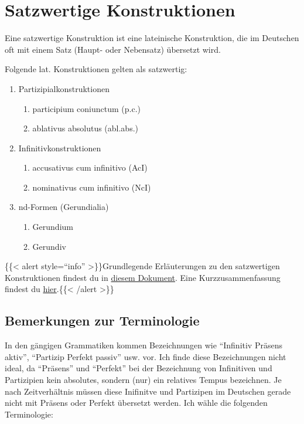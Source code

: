 \documentclass{scrartcl}
\begin{document}
\section{Satzwertige Konstruktionen}
\label{sec:org5e2f0dd}
Eine satzwertige Konstruktion ist eine lateinische Konstruktion, die
im Deutschen oft mit einem Satz (Haupt- oder Nebensatz) übersetzt
wird.

Folgende lat. Konstruktionen gelten als satzwertig:

\begin{enumerate}
\item Partizipialkonstruktionen
\begin{enumerate}
\item participium coniunctum (p.c.)
\item ablativus absolutus (abl.abs.)
\end{enumerate}
\item Infinitivkonstruktionen
\begin{enumerate}
\item accusativus cum infinitivo (AcI)
\item nominativus cum infinitivo (NcI)
\end{enumerate}
\item nd-Formen (Gerundialia)
\begin{enumerate}
\item Gerundium
\item Gerundiv
\end{enumerate}
\end{enumerate}


\{\{< alert style="`info"' >\}\}Grundlegende Erläuterungen zu den satzwertigen Konstruktionen findest du in \href{https://www.dropbox.com/s/k0ti2cgg8m66et7/Satzwertige\_Konstruktionen.pdf?dl=0}{diesem Dokument}. Eine Kurzzusammenfassung findest du \href{https://www.dropbox.com/s/v87gtz2q3sikbyz/Satzwertige\_Konstruktionen\_SuS.pdf?dl=0}{hier}.\{\{< /alert >\}\}

\subsection{Bemerkungen zur Terminologie}
\label{sec:orgbc6583e}

In den gängigen Grammatiken kommen Bezeichnungen wie "`Infinitiv Präsens aktiv"', "`Partizip Perfekt passiv"' usw. vor. Ich finde diese Bezeichnungen nicht ideal, da "`Präsens"' und "`Perfekt"' bei der Bezeichnung von Infinitiven und Partizipien kein absolutes, sondern (nur) ein relatives Tempus bezeichnen. Je nach Zeitverhältnis müssen diese Inifinitve und Partizipen im Deutschen gerade nicht mit Präsens oder Perfekt übersetzt werden. Ich wähle die folgenden Terminologie:
\end{document}
